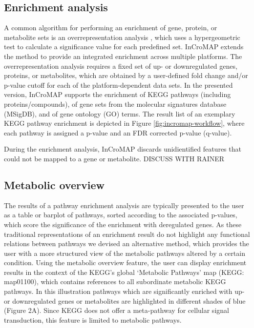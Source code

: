 \documentclass[final,5p,times,twocolumn]{elsarticle}
\begin{document}
\subsection{Enrichment analysis}
A common algorithm for performing an enrichment of gene, protein, or metabolite sets is an overrepresentation analysis \cite{Backes2007}, which uses a hypergeometric test to calculate a significance value for each predefined set. InCroMAP extends the method to provide an integrated enrichment across multiple platforms. The overrepresentation analysis requires a fixed set of up- or downregulated genes, proteins, or metabolites, which are obtained by a user-defined fold change and/or p-value cutoff for each of the platform-dependent data sets. In the presented version, InCroMAP supports the enrichment of KEGG pathways (including proteins/compounds), of gene sets from the molecular signatures database (MSigDB), and of gene ontology (GO) terms. The result list of an exemplary KEGG pathway enrichment is depicted in Figure \ref{fig:incromap-workflow}, where each pathway is assigned a p-value and an FDR corrected p-value (q-value).

During the enrichment analysis, InCroMAP discards unidientified features that could not be mapped to a gene or metabolite. DISCUSS WITH RAINER

\subsection{Metabolic overview}
The results of a pathway enrichment analysis are typically presented to the user as a table or barplot of pathways, sorted according to the associated p-values, which score the significance of the enrichment with deregulated genes. As these traditional representations of an enrichment result do not highlight any functional relations between pathways we devised an alternative method, which provides the user with a more structured view of the metabolic pathways altered by a certain condition. Using the metabolic overview feature, the user can display enrichment results in the context of the KEGG's global `Metabolic Pathways' map (KEGG: map01100), which contains references to all subordinate metabolic KEGG pathways. In this illustration pathways which are significantly enriched with up- or downregulated genes or metabolites are highlighted in different shades of blue (Figure 2A). Since KEGG does not offer a meta-pathway for cellular signal transduction, this feature is limited to metabolic pathways.
\end{document}
